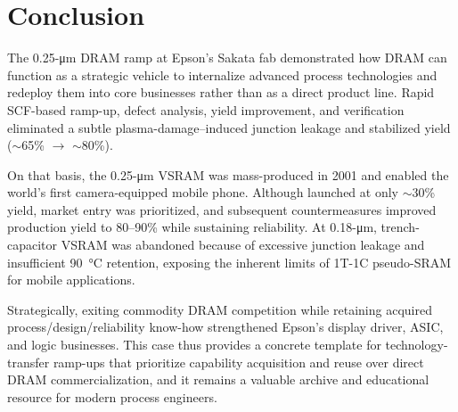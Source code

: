 \section{Conclusion}
The 0.25-\si{\micro\meter} DRAM ramp at Epson’s Sakata fab demonstrated how DRAM can function as a strategic vehicle to internalize advanced process technologies and redeploy them into core businesses rather than as a direct product line. Rapid SCF-based ramp-up, defect analysis, yield improvement, and verification eliminated a subtle plasma-damage–induced junction leakage and stabilized yield ($\sim$65\% $\rightarrow$ $\sim$80\%). 

On that basis, the 0.25-\si{\micro\meter} VSRAM was mass-produced in 2001 and enabled the world’s first camera-equipped mobile phone. Although launched at only $\sim$30\% yield, market entry was prioritized, and subsequent countermeasures improved production yield to 80--90\% while sustaining reliability. At 0.18-\si{\micro\meter}, trench-capacitor VSRAM was abandoned because of excessive junction leakage and insufficient 90~°C retention, exposing the inherent limits of 1T-1C pseudo-SRAM for mobile applications. 

Strategically, exiting commodity DRAM competition while retaining acquired process/design/reliability know-how strengthened Epson’s display driver, ASIC, and logic businesses. This case thus provides a concrete template for technology-transfer ramp-ups that prioritize capability acquisition and reuse over direct DRAM commercialization, and it remains a valuable archive and educational resource for modern process engineers.
